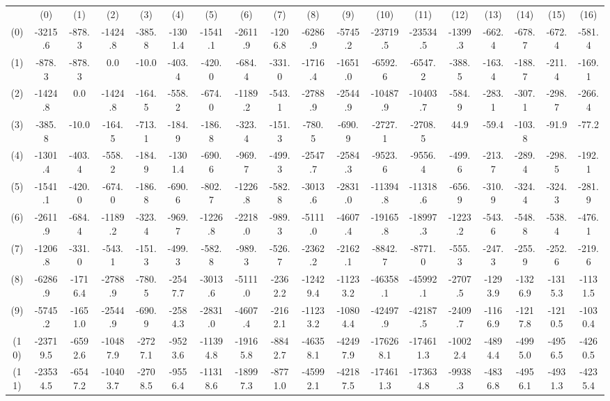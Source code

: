 \begin{tabular}{cccccccccccccccccc}
 & (0) & (1) & (2) & (3) & (4) & (5) & (6) & (7) & (8) & (9) & (10) & (11) & (12) & (13) & (14) & (15) & (16) \\
(0) & -3215.6 & -878.3 & -1424.8 & -385.8 & -1301.4 & -1541.1 & -2611.9 & -1206.8 & -6286.9 & -5745.2 & -23719.5 & -23534.5 & -1399.3 & -662.4 & -678.7 & -672.4 & -581.4 \\
(1) & -878.3 & -878.3 & 0.0 & -10.0 & -403.4 & -420.0 & -684.4 & -331.0 & -1716.4 & -1651.0 & -6592.6 & -6547.2 & -388.5 & -163.4 & -188.7 & -211.4 & -169.1 \\
(2) & -1424.8 & 0.0 & -1424.8 & -164.5 & -558.2 & -674.0 & -1189.2 & -543.1 & -2788.9 & -2544.9 & -10487.9 & -10403.7 & -584.9 & -283.1 & -307.1 & -298.7 & -266.4 \\
(3) & -385.8 & -10.0 & -164.5 & -713.1 & -184.9 & -186.8 & -323.4 & -151.3 & -780.5 & -690.9 & -2727.1 & -2708.5 & 44.9 & -59.4 & -103.8 & -91.9 & -77.2 \\
(4) & -1301.4 & -403.4 & -558.2 & -184.9 & -1301.4 & -690.6 & -969.7 & -499.3 & -2547.7 & -2584.3 & -9523.6 & -9556.4 & -499.6 & -213.7 & -289.4 & -298.5 & -192.1 \\
(5) & -1541.1 & -420.0 & -674.0 & -186.8 & -690.6 & -802.7 & -1226.8 & -582.8 & -3013.6 & -2831.0 & -11394.8 & -11318.6 & -656.9 & -310.9 & -324.4 & -324.3 & -281.9 \\
(6) & -2611.9 & -684.4 & -1189.2 & -323.4 & -969.7 & -1226.8 & -2218.0 & -989.3 & -5111.0 & -4607.4 & -19165.8 & -18997.3 & -1223.2 & -543.6 & -548.8 & -538.4 & -476.1 \\
(7) & -1206.8 & -331.0 & -543.1 & -151.3 & -499.3 & -582.8 & -989.3 & -526.7 & -2362.2 & -2162.1 & -8842.7 & -8771.0 & -555.3 & -247.3 & -255.9 & -252.6 & -219.6 \\
(8) & -6286.9 & -1716.4 & -2788.9 & -780.5 & -2547.7 & -3013.6 & -5111.0 & -2362.2 & -12429.4 & -11233.2 & -46358.1 & -45992.1 & -2707.5 & -1293.9 & -1326.9 & -1315.3 & -1131.5 \\
(9) & -5745.2 & -1651.0 & -2544.9 & -690.9 & -2584.3 & -2831.0 & -4607.4 & -2162.1 & -11233.2 & -10804.4 & -42497.9 & -42187.5 & -2409.7 & -1166.9 & -1217.8 & -1210.5 & -1030.4 \\
(10) & -23719.5 & -6592.6 & -10487.9 & -2727.1 & -9523.6 & -11394.8 & -19165.8 & -8842.7 & -46358.1 & -42497.9 & -176268.1 & -174611.3 & -10022.4 & -4894.4 & -4995.0 & -4956.5 & -4260.5 \\
(11) & -23534.5 & -6547.2 & -10403.7 & -2708.5 & -9556.4 & -11318.6 & -18997.3 & -8771.0 & -45992.1 & -42187.5 & -174611.3 & -173634.8 & -9938.3 & -4836.8 & -4956.1 & -4931.3 & -4235.4 \\

\end{tabular}
